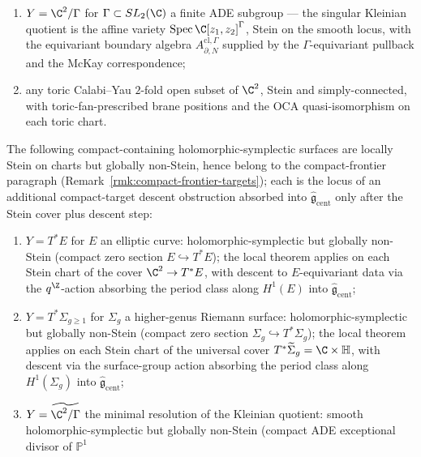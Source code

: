 \begin{cor}
\begin{enumerate}[label=\textup{(\arabic*)},resume]
        (not a diffeomorphism --- \(Y\) is real-\(4\)-dimensional),
        and the singular cohomology is computed from this retraction;
  \item \(Y=\C^2/\Gamma\) for \(\Gamma\subset SL_2(\C)\) a finite ADE
        subgroup --- the singular Kleinian quotient is the affine
        variety
        \(\mathrm{Spec}\,\C[z_1,z_2]^\Gamma\), Stein on the smooth
        locus, with the equivariant boundary algebra
        \(A^{\mathrm{cl},\Gamma}_{\partial,N}\) supplied by the
        \(\Gamma\)-equivariant pullback and the McKay correspondence;
  \item any toric Calabi--Yau \(2\)-fold open subset of \(\C^2\),
        Stein and simply-connected, with toric-fan-prescribed brane
        positions and the OCA quasi-isomorphism on each toric chart.
\end{enumerate}
The following compact-containing holomorphic-symplectic surfaces are
locally Stein on charts but globally non-Stein, hence belong to the
compact-frontier paragraph (Remark~\ref{rmk:compact-frontier-targets});
each is the locus of an additional compact-target descent obstruction
absorbed into \(\widehat{\mathfrak g}_{\mathrm{cent}}\) only after the
Stein cover plus descent step:
\begin{enumerate}[label=\textup{(\arabic*$'$)},start=7]
  \item \(Y=T^*E\) for \(E\) an elliptic curve: holomorphic-symplectic
        but globally non-Stein (compact zero section
        \(E\hookrightarrow T^*E\)); the local theorem applies on each
        Stein chart of the cover \(\C^2\to T^*E\), with descent to
        \(E\)-equivariant data via the \(q^\Z\)-action absorbing the
        period class along \(H^1(E)\) into
        \(\widehat{\mathfrak g}_{\mathrm{cent}}\);
  \item \(Y=T^*\Sigma_{g\geq 1}\) for \(\Sigma_g\) a higher-genus
        Riemann surface: holomorphic-symplectic but globally non-Stein
        (compact zero section \(\Sigma_g\hookrightarrow T^*\Sigma_g\));
        the local theorem applies on each Stein chart of the universal
        cover \(T^*\widetilde\Sigma_g=\C\times\mathbb H\), with
        descent via the surface-group action absorbing the period class
        along \(H^1(\Sigma_g)\) into
        \(\widehat{\mathfrak g}_{\mathrm{cent}}\);
  \item \(Y=\widetilde{\C^2/\Gamma}\) the minimal resolution of the
        Kleinian quotient: smooth holomorphic-symplectic but globally
        non-Stein (compact ADE exceptional divisor of \(\mathbb P^1\)

\end{enumerate}
\end{cor}
